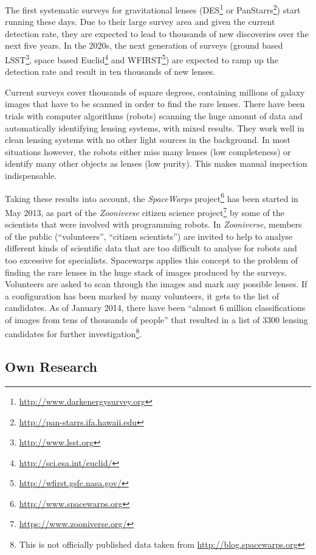 \documentclass[11pt]{article}
\begin{document}
The first systematic surveys for gravitational lenses (DES\footnote{\url{http://www.darkenergysurvey.org}} or PanStarrs\footnote{\url{http://pan-starrs.ifa.hawaii.edu}}) start running these days.
Due to their large survey area and given the current detection rate, they are expected to lead to thousands of new discoveries over the next five years.
In the 2020s, the next generation of surveys (ground based LSST\footnote{\url{http://www.lsst.org}}, space based Euclid\footnote{\url{http://sci.esa.int/euclid/}} and WFIRST\footnote{\url{http://wfirst.gsfc.nasa.gov/}}) are expected to ramp up the detection rate and result in ten thousands of new lenses.

Current surveys cover thousands of square degrees, containing millions of galaxy images that have to be scanned in order to find the rare lenses.
There have been trials with computer algorithms (robots) scanning the huge amount of data and automatically identifying lensing systems\cite{robots}, with mixed results.
They work well in clean lensing systems with no other light sources in the background.
In most situations however, the robots either miss many lenses (low completeness) or identify many other objects as lenses (low purity).
This makes manual inspection indispensable.

Taking these results into account, the \emph{SpaceWarps} project\footnote{\url{http://www.spacewarps.org}} has been started in May 2013, as part of the \emph{Zooniverse} citizen science project\footnote{\url{https://www.zooniverse.org/}} by some of the scientists that were involved with programming robots.
In \emph{Zooniverse}, members of the public (``volunteers'', ``citizen scientists'') are invited to help to analyse different kinds of scientific data that are too difficult to analyse for robots and too excessive for specialists.
Spacewarps applies this concept to the problem of finding the rare lenses in the huge stack of images produced by the surveys.
Volunteers are asked to scan through the images and mark any possible lenses.
If a configuration has been marked by many volunteers, it gets to the list of candidates.
As of January 2014, there have been ``almost 6 million classifications of images from tens of thousands of people'' that resulted in a list of 3300 lensing candidates for further investigation\footnote{This is not officially published data taken from \url{http://blog.spacewarps.org}}.



\subsection{Own Research}
\end{document}
